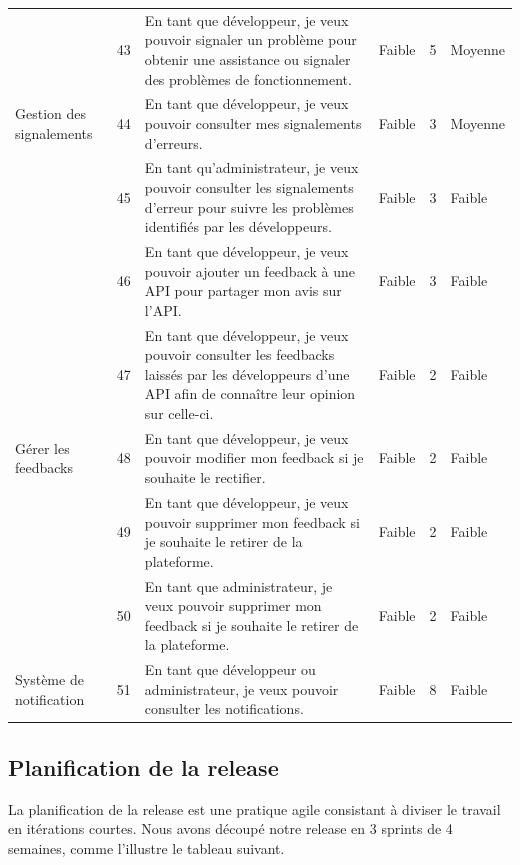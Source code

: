 \begin{landscape}
\begin{longtable}[c]{
    |p{}
    |p{}
    |p{}
    |p{}
    |p{}
    |p{}|
    }
 & 43 & En tant que développeur, je veux pouvoir signaler un problème pour obtenir une assistance ou signaler des problèmes de fonctionnement. & Faible & 5 & Moyenne \\
\cline{2-2} \cline{3-6}

Gestion des signalements & 44 & En tant que développeur, je veux pouvoir consulter mes signalements d'erreurs. & Faible & 3 & Moyenne \\
\cline{2-2} \cline{3-6}

 & 45 & En tant qu'administrateur, je veux pouvoir consulter les signalements d'erreur pour suivre les problèmes identifiés par les développeurs. & Faible & 3 & Faible \\
\hline
 & 46 & En tant que développeur, je veux pouvoir ajouter un feedback à une API pour partager mon avis sur l'API. & Faible & 3 & Faible \\
\cline{2-2} \cline{3-6}
 & 47 & En tant que développeur, je veux pouvoir consulter les feedbacks laissés par les développeurs d'une API afin de connaître leur opinion sur celle-ci. & Faible & 2 & Faible \\
\cline{2-2} \cline{3-6}
Gérer les feedbacks & 48 & En tant que développeur, je veux pouvoir modifier mon feedback si je souhaite le rectifier. & Faible & 2 & Faible \\
\cline{2-2} \cline{3-6}
 & 49 & En tant que développeur, je veux pouvoir supprimer mon feedback si je souhaite le retirer de la plateforme. & Faible & 2 & Faible \\
\cline{2-2} \cline{3-6}
 & 50 & En tant que administrateur, je veux pouvoir supprimer mon feedback si je souhaite le retirer de la plateforme. & Faible & 2 & Faible \\
\hline

Système de notification & 51 & En tant que développeur ou administrateur, je veux pouvoir consulter les notifications. & Faible & 8 & Faible \\
\hline
\end{longtable}
\end{landscape}




\subsection{Planification de la release }
La planification de la release est une pratique agile consistant à diviser le travail en itérations courtes. Nous avons découpé notre release en 3 sprints de 4 semaines, comme l’illustre le tableau suivant.

